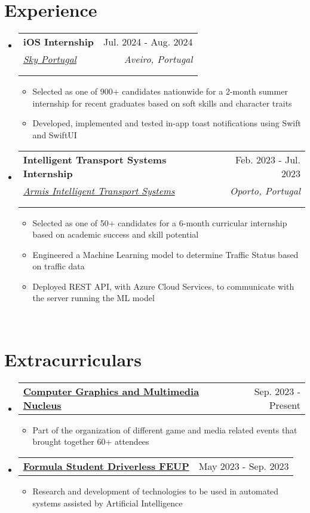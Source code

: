 \documentclass[a4paper,11pt]{article}
\makeatletter
\newcommand{\resumeItem}[1]{
  \item\small{
    {#1 \vspace{-2pt}}
  }
}
\newcommand{\resumeSubheading}[5]{
  \vspace{-2pt}\item
    \begin{tabular*}{0.97\textwidth}[t]{l@{\extracolsep{\fill}}r}
      \textbf{#1} & #2 \\
      \textit{\small#3} & \textit{\small #4} \\
      \if\relax\detokenize{#5}\relax
      \else
        \multicolumn{2}{@{}l}{\textit{\small#5}} \\
      \fi
    \end{tabular*}\vspace{-7pt}
}
\newcommand{\resumeSubSubheading}[2]{
    \item
    \begin{tabular*}{0.97\textwidth}{l@{\extracolsep{\fill}}r}
      \textit{\small#1} & \textit{\small #2} \\
    \end{tabular*}\vspace{-7pt}
}
\newcommand{\resumeProjectHeading}[2]{
    \item
    \begin{tabular*}{0.97\textwidth}{l@{\extracolsep{\fill}}r}
      \small#1 & #2 \\
    \end{tabular*}\vspace{-7pt}
}
\newcommand{\resumeSubHeadingListStart}{\begin{itemize}[leftmargin=0.15in, label={}]}
\newcommand{\resumeSubHeadingListEnd}{\end{itemize}}
\newcommand{\resumeItemListStart}{\begin{itemize}}
\newcommand{\resumeItemListEnd}{\end{itemize}\vspace{-5pt}}
\makeatother
\begin{document}

\section{Experience}
  \resumeSubHeadingListStart

    \resumeSubheading
        {iOS Internship}{Jul. 2024 - Aug. 2024}
        {\href{https://www.sky.com/}{Sky Portugal}}{Aveiro, Portugal}
        {}
        \resumeItemListStart
            \resumeItem{Selected as one of 900+ candidates nationwide for a 2-month summer internship for recent graduates based on soft skills and character traits}
            \resumeItem{Developed, implemented and tested in-app toast notifications using Swift and SwiftUI}
        \resumeItemListEnd

    \resumeSubheading
      {Intelligent Transport Systems Internship}{Feb. 2023 - Jul. 2023}
      {\href{https://www.armisgroup.com/intelligent-transport-systems/}{Armis Intelligent Transport Systems}}{Oporto, Portugal}
      {}
      \resumeItemListStart
        \resumeItem{Selected as one of 50+ candidates for a 6-month curricular internship based on academic success and skill potential}
        \resumeItem{Engineered a Machine Learning model to determine Traffic Status based on traffic data}
        \resumeItem{Deployed REST API, with Azure Cloud Services, to communicate with the server running the ML model}
      \resumeItemListEnd
  \resumeSubHeadingListEnd
\leavevmode \\ %

\section{Extracurriculars}
    \resumeSubHeadingListStart
      \resumeProjectHeading
                {\textbf{\href{https://ncgm.fe.up.pt/}{Computer Graphics and Multimedia Nucleus}}}{Sep. 2023 - Present}
          \resumeItemListStart
            \resumeItem{Part of the organization of different game and media related events that brought together 60+ attendees}
          \resumeItemListEnd
      \resumeProjectHeading
          {\textbf{\href{https://formulastudent.fe.up.pt/en/}{Formula Student Driverless FEUP}}}{May 2023 - Sep. 2023}
          \resumeItemListStart
            \resumeItem{Research and development of technologies to be used in automated systems assisted by Artificial Intelligence}
          \resumeItemListEnd
    \resumeSubHeadingListEnd
\leavevmode \\ %
\end{document}
